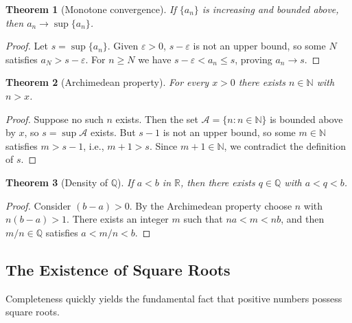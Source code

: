 \documentclass{article}
\theoremstyle{definition}
\theoremstyle{plain}
\newtheorem{theorem}{Theorem}[section]
\begin{document}
	\begin{theorem}[Monotone convergence]\label{thm:monotone}
		If $\{a_n\}$ is increasing and bounded above, then $a_n\to \sup\{a_n\}$.
	\end{theorem}
	\begin{proof}
		Let $s=\sup\{a_n\}$. Given $\varepsilon>0$, $s-\varepsilon$ is not an upper bound, so some $N$ satisfies $a_N>s-\varepsilon$. For $n\ge N$ we have $s-\varepsilon<a_n\le s$, proving $a_n\to s$.
	\end{proof}

	\begin{theorem}[Archimedean property]\label{thm:archimedean}
		For every $x>0$ there exists $n\in\mathbb{N}$ with $n>x$.
	\end{theorem}
	\begin{proof}
		Suppose no such $n$ exists. Then the set $\mathcal{A}=\{n : n\in\mathbb{N}\}$ is bounded above by $x$, so $s=\sup\mathcal{A}$ exists. But $s-1$ is not an upper bound, so some $m\in\mathbb{N}$ satisfies $m>s-1$, i.e., $m+1>s$. Since $m+1\in \mathbb{N}$, we contradict the definition of $s$.
	\end{proof}

	\begin{theorem}[Density of $\mathbb{Q}$]\label{thm:density}
		If $a<b$ in $\mathbb{R}$, then there exists $q\in\mathbb{Q}$ with $a<q<b$.
	\end{theorem}
	\begin{proof}
		Consider $(b-a)>0$. By the Archimedean property choose $n$ with $n(b-a)>1$. There exists an integer $m$ such that $na<m<nb$, and then $m/n\in\mathbb{Q}$ satisfies $a<m/n<b$.
	\end{proof}

	\subsection{The Existence of Square Roots}\label{subsec:square-roots}
	Completeness quickly yields the fundamental fact that positive numbers possess square roots.
\end{document}
